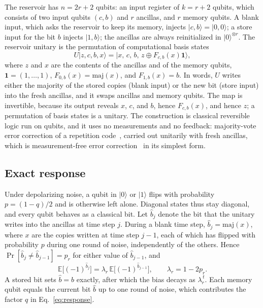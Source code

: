 \documentclass[aps,prl,twocolumn,superscriptaddress,floatfix]{revtex4-2}
\theoremstyle{plain}
\newcommand{\ket}[1]{|#1\rangle}
\begin{document}
The reservoir has $n=2r+2$ qubits: an input register of $k=r+2$ qubits, which consists of two input qubits $(c,b)$ and $r$ ancillas, and $r$ memory qubits. A blank input, which asks the reservoir to keep its memory, injects $\ket{c,b}=\ket{0,0}$; a store input for the bit $b$ injects $\ket{1,b}$; the ancillas are always reinitialized in $\ket0^{\otimes r}$. The reservoir unitary is the permutation of computational basis states
\begin{equation}
U\ket{z,c,b,x}=\ket{x,\,c,\,b,\,z\oplus F_{c,b}(x)\bm1},
\label{eq:S-repU}
\end{equation}
where $z$ and $x$ are the contents of the ancillas and of the memory qubits, $\bm1=(1,\dots,1)$, $F_{0,b}(x)=\mathrm{maj}(x)$, and $F_{1,b}(x)=b$. In words, $U$ writes either the majority of the stored copies (blank input) or the new bit (store input) into the fresh ancillas, and it swaps ancillas and memory qubits. The map is invertible, because its output reveals $x$, $c$, and $b$, hence $F_{c,b}(x)$, and hence $z$; a permutation of basis states is a unitary. The construction is classical reversible logic run on qubits, and it uses no measurements and no feedback: majority-vote error correction of a repetition code~\cite{vonNeumann1956}, carried out unitarily with fresh ancillas, which is measurement-free error correction~\cite{Heussen2024} in its simplest form.

\subsection{Exact response}

Under depolarizing noise, a qubit in $\ket0$ or $\ket1$ flips with probability $p=(1-q)/2$ and is otherwise left alone. Diagonal states thus stay diagonal, and every qubit behaves as a classical bit. Let $\hat b_j$ denote the bit that the unitary writes into the ancillas at time step $j$. During a blank time step, $\hat b_j=\mathrm{maj}(x)$, where $x$ are the copies written at time step $j-1$, each of which has flipped with probability $p$ during one round of noise, independently of the others. Hence $\Pr[\hat b_j\ne\hat b_{j-1}]=p_r$ for either value of $\hat b_{j-1}$, and
\begin{equation}
\mathbb E\bigl[(-1)^{\hat b_j}\bigr]=\lambda_r\,\mathbb E\bigl[(-1)^{\hat b_{j-1}}\bigr],\qquad\lambda_r=1-2p_r .
\end{equation}
A stored bit sets $\hat b=b$ exactly, after which the bias decays as $\lambda_r^{\,t}$. Each memory qubit equals the current bit $\hat b$ up to one round of noise, which contributes the factor $q$ in Eq.~\eqref{eq:response}.
\end{document}

